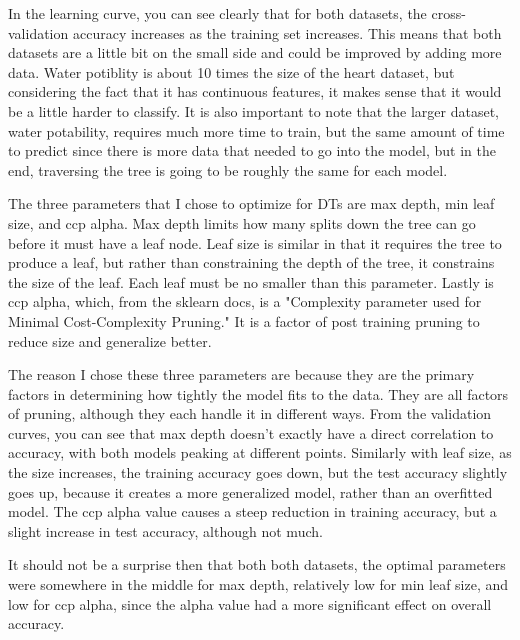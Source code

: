 \documentclass[
	letterpaper, %
]{mlreport}
\begin{document}
In the learning curve, you can see clearly that for both datasets, the cross-validation accuracy increases as the training set increases. This means that both datasets are a little bit on the small side and could be improved by adding more data. Water potiblity is about 10 times the size of the heart dataset, but considering the fact that it has continuous features, it makes sense that it would be a little harder to classify. It is also important to note that the larger dataset, water potability, requires much more time to train, but the same amount of time to predict since there is more data that needed to go into the model, but in the end, traversing the tree is going to be roughly the same for each model.

The three parameters that I chose to optimize for DTs are max depth, min leaf size, and ccp alpha. Max depth limits how many splits down the tree can go before it must have a leaf node. Leaf size is similar in that it requires the tree to produce a leaf, but rather than constraining the depth of the tree, it constrains the size of the leaf. Each leaf must be no smaller than this parameter. Lastly is ccp alpha, which, from the sklearn docs, is a "Complexity parameter used for Minimal Cost-Complexity Pruning." It is a factor of post training pruning to reduce size and generalize better.

The reason I chose these three parameters are because they are the primary factors in determining how tightly the model fits to the data. They are all factors of pruning, although they each handle it in different ways. From the validation curves, you can see that max depth doesn't exactly have a direct correlation to accuracy, with both models peaking at different points. Similarly with leaf size, as the size increases, the training accuracy goes down, but the test accuracy slightly goes up, because it creates a more generalized model, rather than an overfitted model. The ccp alpha value causes a steep reduction in training accuracy, but a slight increase in test accuracy, although not much.

It should not be a surprise then that both both datasets, the optimal parameters were somewhere in the middle for max depth, relatively low for min leaf size, and low for ccp alpha, since the alpha value had a more significant effect on overall accuracy.
\end{document}

